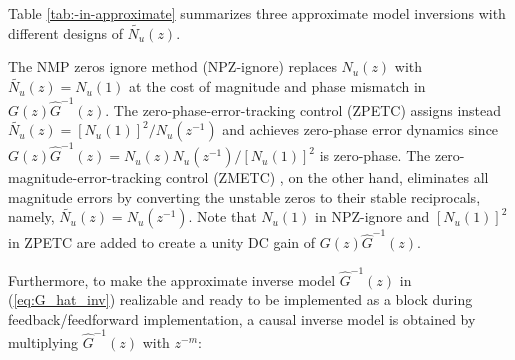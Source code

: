 \documentclass [11pt, proquest] {uwthesis}[2020/02/24]
\begin{document}
Table \ref{tab:-in-approximate} summarizes three approximate model
inversions with different designs of $\tilde{N_{u}}(z)$. 
\begin{table}
\caption{\label{tab:-in-approximate}$\tilde{N_{u}}(z)$, $G(z)\hat{G}^{-1}(z)$,
and $\frac{Y(z)}{R(z)}$ in approximate model inversions. $Y(z)$
and $R(z)$ are transfer functions of the output and reference signals
shown in Fig. \ref{fig:Block-diagram-for-1}.}

\end{table}
The NMP zeros ignore method (NPZ-ignore) \cite{butterworth_analysis_2012,Butterworth2008}
replaces $N_{u}(z)$ with $\tilde{N_{u}}(z)=N_{u}(1)$ at the cost
of magnitude and phase mismatch in $G(z)\hat{G}^{-1}(z)$. The zero-phase-error-tracking
control (ZPETC) \cite{Tomizuka1987} assigns instead $\tilde{N_{u}}(z)=[N_{u}(1)]^{2}/N_{u}(z^{-1})$
and achieves zero-phase error dynamics since $G(z)\hat{G}^{-1}(z)=N_{u}(z)N_{u}(z^{-1})/[N_{u}(1)]^{2}$
is zero-phase. The zero-magnitude-error-tracking control (ZMETC) \cite{butterworth_analysis_2012},
on the other hand, eliminates all magnitude errors by converting the
unstable zeros to their stable reciprocals, namely, $\tilde{N_{u}}(z)=N_{u}(z^{-1})$.
Note that $N_{u}(1)$ in NPZ-ignore and $[N_{u}(1)]^{2}$ in ZPETC
are added to create a unity DC gain of $G(z)\hat{G}^{-1}(z)$.

Furthermore, to make the approximate inverse model $\hat{G}^{-1}(z)$
in (\ref{eq:G_hat_inv}) realizable and ready to be implemented as
a block during feedback/feedforward implementation, a causal inverse
model is obtained by multiplying $\hat{G}^{-1}(z)$ with $z^{-m}$:
\end{document}
